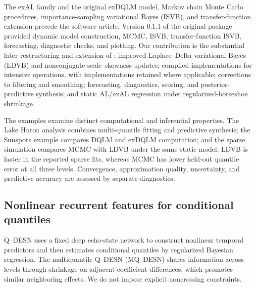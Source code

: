 The exAL family and the original exDQLM model, Markov chain Monte Carlo
procedures, importance-sampling variational Bayes (ISVB), and transfer-function
extension precede the software article. Version 0.1.1 of the original package
provided dynamic model construction, MCMC, ISVB, transfer-function ISVB,
forecasting, diagnostic checks, and plotting. Our contribution is the substantial
later restructuring and extension of : improved
Laplace--Delta variational Bayes (LDVB) and nonconjugate scale--skewness updates;
compiled implementations for intensive operations, with 
implementations retained where applicable; corrections to filtering and
smoothing; forecasting, diagnostics, scoring, and posterior-predictive
synthesis; and static AL/exAL regression under regularized-horseshoe shrinkage.

The examples examine distinct computational and inferential properties. The Lake Huron
analysis combines multi-quantile fitting and predictive synthesis; the
Sunspots example compares DQLM and exDQLM computation; and the sparse
simulation compares MCMC with LDVB under the same static model. LDVB is faster
in the reported sparse fits, whereas MCMC has lower held-out quantile error at
all three levels. Convergence, approximation quality, uncertainty, and
predictive accuracy are assessed by separate diagnostics.

\subsection{Nonlinear recurrent features for conditional quantiles}

Q--DESN uses a fixed deep echo-state network to construct nonlinear temporal
predictors and then estimates conditional quantiles by regularized Bayesian
regression. The multiquantile Q--DESN (MQ--DESN) shares information across
levels through shrinkage on adjacent coefficient differences, which promotes
similar neighboring effects. We do not impose explicit noncrossing constraints.

